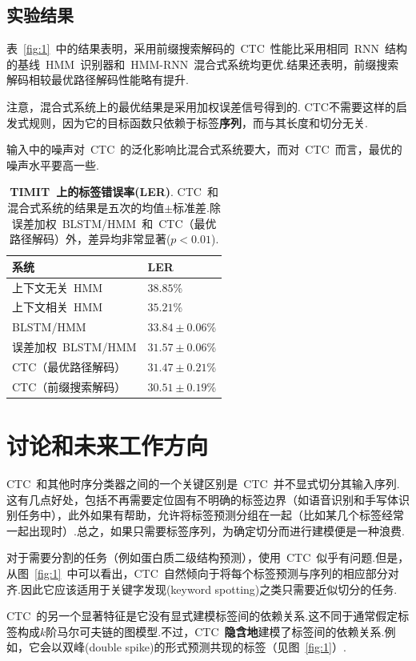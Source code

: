 \documentclass{ctexart}
\begin{document}
\subsection{实验结果}
表~\ref{fig:1}~中的结果表明，采用前缀搜索解码的~CTC~性能比采用相同~RNN~结构的基线~HMM~识别器和~HMM-RNN~混合式系统均更优.结果还表明，前缀搜索解码相较最优路径解码性能略有提升.

注意，混合式系统上的最优结果是采用加权误差信号得到的. CTC不需要这样的启发式规则，因为它的目标函数只依赖于标签\textbf{序列}，而与其长度和切分无关.

输入中的噪声对~CTC~的泛化影响比混合式系统要大，而对~CTC~而言，最优的噪声水平要高一些.
\begin{table}
	\centering
	\caption{\textbf{TIMIT~上的标签错误率(LER)}. CTC~和混合式系统的结果是五次的均值$\pm$标准差.除误差加权~BLSTM/HMM~和~CTC（最优路径解码）外，差异均非常显著($p<0.01$).}
	\label{table:1}
	\begin{tabular}{ll}
		\hline
		系统            & LER \\ \hline
		上下文无关~HMM      &  $38.85$\%   \\
		上下文相关~HMM      &  $35.21$\%   \\
		BLSTM/HMM     &  $33.84\pm 0.06$\%   \\
		误差加权~BLSTM/HMM &  $31.57\pm 0.06$\%   \\
		CTC（最优路径解码）   &  $31.47\pm 0.21$\%   \\
		CTC（前缀搜索解码）   &  $30.51\pm 0.19$\%  \\ \hline
	\end{tabular}
\end{table}
\section{讨论和未来工作方向}
\label{sec:discussion}
CTC~和其他时序分类器之间的一个关键区别是~CTC~并不显式切分其输入序列.这有几点好处，包括不再需要定位固有不明确的标签边界（如语音识别和手写体识别任务中），此外如果有帮助，允许将标签预测分组在一起（比如某几个标签经常一起出现时）.总之，如果只需要标签序列，为确定切分而进行建模便是一种浪费.

对于需要分割的任务（例如蛋白质二级结构预测），使用~CTC~似乎有问题.但是，从图~\ref{fig:1}~中可以看出，CTC~自然倾向于将每个标签预测与序列的相应部分对齐.因此它应该适用于关键字发现(keyword spotting)之类只需要近似切分的任务.

CTC~的另一个显著特征是它没有显式建模标签间的依赖关系.这不同于通常假定标签构成$k$阶马尔可夫链的图模型.不过，CTC~\textbf{隐含地}建模了标签间的依赖关系.例如，它会以双峰(double spike)的形式预测共现的标签（见图~\ref{fig:1}）.
\end{document}
